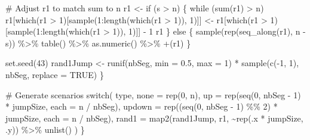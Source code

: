 \documentclass[
  letterpaper,
  DIV=11,
  numbers=noendperiod]{scrreprt}
\newenvironment{Shaded}{\begin{snugshade}}{\end{snugshade}}
\newcommand{\AttributeTok}[1]{\textcolor[rgb]{0.40,0.45,0.13}{#1}}
\newcommand{\CommentTok}[1]{\textcolor[rgb]{0.37,0.37,0.37}{#1}}
\newcommand{\ConstantTok}[1]{\textcolor[rgb]{0.56,0.35,0.01}{#1}}
\newcommand{\ControlFlowTok}[1]{\textcolor[rgb]{0.00,0.23,0.31}{#1}}
\newcommand{\DecValTok}[1]{\textcolor[rgb]{0.68,0.00,0.00}{#1}}
\newcommand{\FloatTok}[1]{\textcolor[rgb]{0.68,0.00,0.00}{#1}}
\newcommand{\FunctionTok}[1]{\textcolor[rgb]{0.28,0.35,0.67}{#1}}
\newcommand{\NormalTok}[1]{\textcolor[rgb]{0.00,0.23,0.31}{#1}}
\newcommand{\OtherTok}[1]{\textcolor[rgb]{0.00,0.23,0.31}{#1}}
\newcommand{\SpecialCharTok}[1]{\textcolor[rgb]{0.37,0.37,0.37}{#1}}
\newcommand{\StringTok}[1]{\textcolor[rgb]{0.13,0.47,0.30}{#1}}
\begin{document}
\begin{Shaded}
\begin{Highlighting}[]
    \CommentTok{\# Adjust r1 to match sum to n}
\NormalTok{    r1 }\OtherTok{\textless{}{-}} \ControlFlowTok{if}\NormalTok{ (s }\SpecialCharTok{\textgreater{}}\NormalTok{ n) \{}
      \ControlFlowTok{while}\NormalTok{ (}\FunctionTok{sum}\NormalTok{(r1) }\SpecialCharTok{\textgreater{}}\NormalTok{ n) r1[}\FunctionTok{which}\NormalTok{(r1 }\SpecialCharTok{\textgreater{}} \DecValTok{1}\NormalTok{)[}\FunctionTok{sample}\NormalTok{(}\DecValTok{1}\SpecialCharTok{:}\FunctionTok{length}\NormalTok{(}\FunctionTok{which}\NormalTok{(r1 }\SpecialCharTok{\textgreater{}} \DecValTok{1}\NormalTok{)), }\DecValTok{1}\NormalTok{)]] }\OtherTok{\textless{}{-}}\NormalTok{ r1[}\FunctionTok{which}\NormalTok{(r1 }\SpecialCharTok{\textgreater{}} \DecValTok{1}\NormalTok{)[}\FunctionTok{sample}\NormalTok{(}\DecValTok{1}\SpecialCharTok{:}\FunctionTok{length}\NormalTok{(}\FunctionTok{which}\NormalTok{(r1 }\SpecialCharTok{\textgreater{}} \DecValTok{1}\NormalTok{)), }\DecValTok{1}\NormalTok{)]] }\SpecialCharTok{{-}} \DecValTok{1}
\NormalTok{      r1}
\NormalTok{    \} }\ControlFlowTok{else}\NormalTok{ \{}
      \FunctionTok{sample}\NormalTok{(}\FunctionTok{rep}\NormalTok{(}\FunctionTok{seq\_along}\NormalTok{(r1), n }\SpecialCharTok{{-}}\NormalTok{ s)) }\SpecialCharTok{\%\textgreater{}\%} \FunctionTok{table}\NormalTok{() }\SpecialCharTok{\%\textgreater{}\%} \FunctionTok{as.numeric}\NormalTok{() }\SpecialCharTok{\%\textgreater{}\%} \StringTok{\textasciigrave{}}\AttributeTok{+}\StringTok{\textasciigrave{}}\NormalTok{(r1)}
\NormalTok{    \}}

    \FunctionTok{set.seed}\NormalTok{(}\DecValTok{43}\NormalTok{)}
\NormalTok{    rand1Jump }\OtherTok{\textless{}{-}} \FunctionTok{runif}\NormalTok{(nbSeg, }\AttributeTok{min =} \FloatTok{0.5}\NormalTok{, }\AttributeTok{max =} \DecValTok{1}\NormalTok{) }\SpecialCharTok{*} \FunctionTok{sample}\NormalTok{(}\FunctionTok{c}\NormalTok{(}\SpecialCharTok{{-}}\DecValTok{1}\NormalTok{, }\DecValTok{1}\NormalTok{), nbSeg, }\AttributeTok{replace =} \ConstantTok{TRUE}\NormalTok{)}
\NormalTok{  \}}

  \CommentTok{\# Generate scenarios}
  \ControlFlowTok{switch}\NormalTok{(}
\NormalTok{    type,}
    \AttributeTok{none =} \FunctionTok{rep}\NormalTok{(}\DecValTok{0}\NormalTok{, n),}
    \AttributeTok{up =} \FunctionTok{rep}\NormalTok{(}\FunctionTok{seq}\NormalTok{(}\DecValTok{0}\NormalTok{, nbSeg }\SpecialCharTok{{-}} \DecValTok{1}\NormalTok{) }\SpecialCharTok{*}\NormalTok{ jumpSize, }\AttributeTok{each =}\NormalTok{ n }\SpecialCharTok{/}\NormalTok{ nbSeg),}
    \AttributeTok{updown =} \FunctionTok{rep}\NormalTok{((}\FunctionTok{seq}\NormalTok{(}\DecValTok{0}\NormalTok{, nbSeg }\SpecialCharTok{{-}} \DecValTok{1}\NormalTok{) }\SpecialCharTok{\%\%} \DecValTok{2}\NormalTok{) }\SpecialCharTok{*}\NormalTok{ jumpSize, }\AttributeTok{each =}\NormalTok{ n }\SpecialCharTok{/}\NormalTok{ nbSeg),}
    \AttributeTok{rand1 =} \FunctionTok{map2}\NormalTok{(rand1Jump, r1, }\SpecialCharTok{\textasciitilde{}}\FunctionTok{rep}\NormalTok{(.x }\SpecialCharTok{*}\NormalTok{ jumpSize, .y)) }\SpecialCharTok{\%\textgreater{}\%} \FunctionTok{unlist}\NormalTok{()}
\NormalTok{  )}
\NormalTok{\}}


\end{Highlighting}
\end{Shaded}
\end{document}
